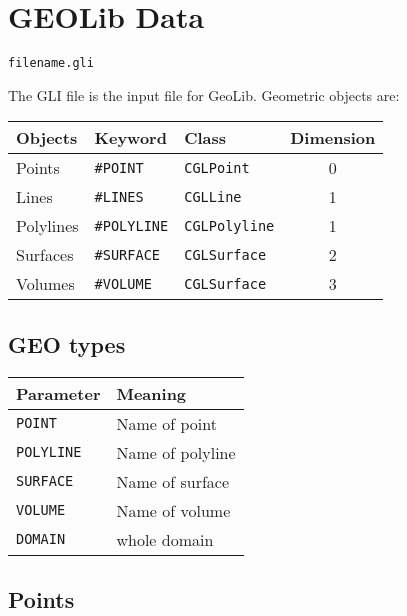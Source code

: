 \section{GEOLib Data}

\begin{verbatim}
filename.gli
\end{verbatim}

The GLI file is the input file for GeoLib. Geometric objects are:
\begin{center}
\begin{tabular}{|l|l|l|c|}
\hline
Objects   & Keyword & Class                & Dimension \\
\hline \hline
%
Points    & \texttt{\#POINT}    & \texttt{CGLPoint}    & 0 \\
Lines     & \texttt{\#LINES}    & \texttt{CGLLine}     & 1 \\
Polylines & \texttt{\#POLYLINE} & \texttt{CGLPolyline} & 1 \\
Surfaces  & \texttt{\#SURFACE}  & \texttt{CGLSurface}  & 2 \\
Volumes   & \texttt{\#VOLUME}   & \texttt{CGLSurface}  & 3 \\
\hline
\end{tabular}
\end{center}

\subsection{GEO types}
\label{sec:geo_types}

\begin{tabular*}{12.773cm}{|p{}|p{8.9cm}|} \hline
Parameter          & Meaning \\ \hline \hline
%
\texttt{POINT}     & Name of point \\
\texttt{POLYLINE}  & Name of polyline \\
\texttt{SURFACE}   & Name of surface \\
\texttt{VOLUME }   & Name of volume \\
\texttt{DOMAIN }   & whole domain \\
\hline
\end{tabular*}

\subsection{Points}

